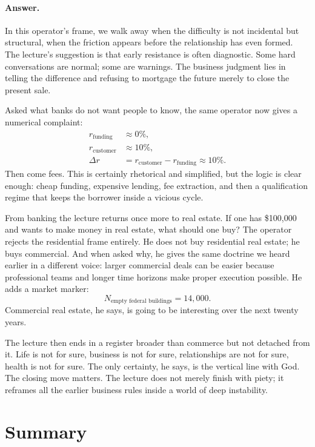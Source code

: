 \paragraph{Answer.} In this operator's frame, we walk away when the difficulty is not incidental but structural, when the friction appears before the relationship has even formed. The lecture's suggestion is that early resistance is often diagnostic. Some hard conversations are normal; some are warnings. The business judgment lies in telling the difference and refusing to mortgage the future merely to close the present sale.

Asked what banks do not want people to know, the same operator now gives a numerical complaint:
\begin{align}
r_{\text{funding}} &\approx 0\%,\\
r_{\text{customer}} &\approx 10\%,\\
\Delta r &= r_{\text{customer}} - r_{\text{funding}} \approx 10\%.
\end{align}
Then come fees. This is certainly rhetorical and simplified, but the logic is clear enough: cheap funding, expensive lending, fee extraction, and then a qualification regime that keeps the borrower inside a vicious cycle.

From banking the lecture returns once more to real estate. If one has \$100{,}000 and wants to make money in real estate, what should one buy? The operator rejects the residential frame entirely. He does not buy residential real estate; he buys commercial. And when asked why, he gives the same doctrine we heard earlier in a different voice: larger commercial deals can be easier because professional teams and longer time horizons make proper execution possible. He adds a market marker:
\begin{equation}
N_{\text{empty federal buildings}} = 14{,}000.
\end{equation}
Commercial real estate, he says, is going to be interesting over the next twenty years.

The lecture then ends in a register broader than commerce but not detached from it. Life is not for sure, business is not for sure, relationships are not for sure, health is not for sure. The only certainty, he says, is the vertical line with God. The closing move matters. The lecture does not merely finish with piety; it reframes all the earlier business rules inside a world of deep instability.

\section{Summary}

